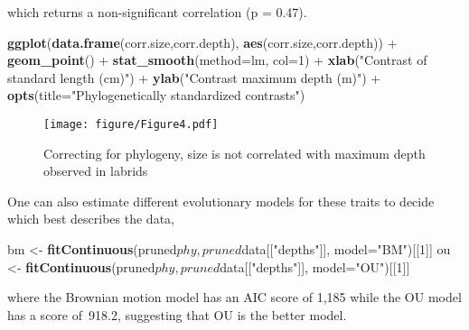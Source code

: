\documentclass[author-year]{elsarticle} %
\newenvironment{Shaded}{}{}
\newcommand{\KeywordTok}[1]{\textcolor[rgb]{0.00,0.44,0.13}{\textbf{{#1}}}}
\newcommand{\DataTypeTok}[1]{\textcolor[rgb]{0.56,0.13,0.00}{{#1}}}
\newcommand{\DecValTok}[1]{\textcolor[rgb]{0.25,0.63,0.44}{{#1}}}
\newcommand{\StringTok}[1]{\textcolor[rgb]{0.25,0.44,0.63}{{#1}}}
\newcommand{\NormalTok}[1]{{#1}}
\begin{document}
\begin{Shaded}
\end{Shaded}
which returns a non-significant correlation (p = 0.47).

\begin{Shaded}
\begin{Highlighting}[]
\KeywordTok{ggplot}\NormalTok{(}\KeywordTok{data.frame}\NormalTok{(corr.size,corr.depth), }\KeywordTok{aes}\NormalTok{(corr.size,corr.depth)) +}
 \KeywordTok{geom_point}\NormalTok{() + }\KeywordTok{stat_smooth}\NormalTok{(}\DataTypeTok{method=}\NormalTok{lm, }\DataTypeTok{col=}\DecValTok{1}\NormalTok{) + }
 \KeywordTok{xlab}\NormalTok{(}\StringTok{"Contrast of standard length (cm)"}\NormalTok{) +}
 \KeywordTok{ylab}\NormalTok{(}\StringTok{"Contrast maximum depth (m)"}\NormalTok{) + }\KeywordTok{opts}\NormalTok{(}\DataTypeTok{title=}\StringTok{"Phylogenetically standardized contrasts"}\NormalTok{)}
\end{Highlighting}
\end{Shaded}
\begin{figure}[htbp]
\centering
\texttt{[image: figure/Figure4.pdf]}
\caption{Correcting for phylogeny, size is not correlated with maximum
depth observed in labrids}
\end{figure}

One can also estimate different evolutionary models for these traits to
decide which best describes the data,

\begin{Shaded}
\begin{Highlighting}[]
\NormalTok{bm <- }\KeywordTok{fitContinuous}\NormalTok{(pruned$phy, pruned$data[[}\StringTok{"depths"}\NormalTok{]], }\DataTypeTok{model=}\StringTok{"BM"}\NormalTok{)[[}\DecValTok{1}\NormalTok{]]}
\NormalTok{ou <- }\KeywordTok{fitContinuous}\NormalTok{(pruned$phy, pruned$data[[}\StringTok{"depths"}\NormalTok{]], }\DataTypeTok{model=}\StringTok{"OU"}\NormalTok{)[[}\DecValTok{1}\NormalTok{]]}
\end{Highlighting}
\end{Shaded}
where the Brownian motion model has an AIC score of 1,185 while the OU
model has a score of~918.2, suggesting that OU is the better model.
\end{document}
